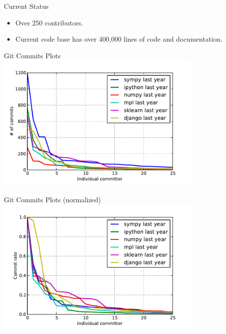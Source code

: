 \documentclass[xcolor=svgnames]{beamer}
\begin{document}
\begin{frame}
  \begin{block}{Current Status}
    \begin{itemize}
    \item Over 250 contributors.
    \item Current code base has over 400,000 lines of code and documentation.
    \end{itemize}
  \end{block}
\end{frame}

\begin{frame}{Git Commits Plots}
\includegraphics[width=4in]{commits1.pdf}
\end{frame}

\begin{frame}{Git Commits Plots (normalized)}
\includegraphics[width=4in]{commits2.pdf}
\end{frame}
\end{document}
